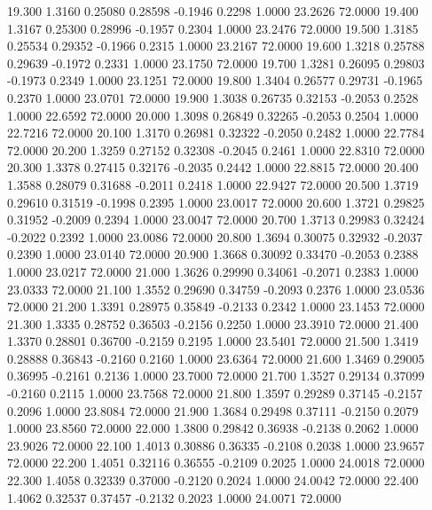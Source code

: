   19.300   1.3160   0.25080   0.28598  -0.1946   0.2298   1.0000  23.2626  72.0000
  19.400   1.3167   0.25300   0.28996  -0.1957   0.2304   1.0000  23.2476  72.0000
  19.500   1.3185   0.25534   0.29352  -0.1966   0.2315   1.0000  23.2167  72.0000
  19.600   1.3218   0.25788   0.29639  -0.1972   0.2331   1.0000  23.1750  72.0000
  19.700   1.3281   0.26095   0.29803  -0.1973   0.2349   1.0000  23.1251  72.0000
  19.800   1.3404   0.26577   0.29731  -0.1965   0.2370   1.0000  23.0701  72.0000
  19.900   1.3038   0.26735   0.32153  -0.2053   0.2528   1.0000  22.6592  72.0000
  20.000   1.3098   0.26849   0.32265  -0.2053   0.2504   1.0000  22.7216  72.0000
  20.100   1.3170   0.26981   0.32322  -0.2050   0.2482   1.0000  22.7784  72.0000
  20.200   1.3259   0.27152   0.32308  -0.2045   0.2461   1.0000  22.8310  72.0000
  20.300   1.3378   0.27415   0.32176  -0.2035   0.2442   1.0000  22.8815  72.0000
  20.400   1.3588   0.28079   0.31688  -0.2011   0.2418   1.0000  22.9427  72.0000
  20.500   1.3719   0.29610   0.31519  -0.1998   0.2395   1.0000  23.0017  72.0000
  20.600   1.3721   0.29825   0.31952  -0.2009   0.2394   1.0000  23.0047  72.0000
  20.700   1.3713   0.29983   0.32424  -0.2022   0.2392   1.0000  23.0086  72.0000
  20.800   1.3694   0.30075   0.32932  -0.2037   0.2390   1.0000  23.0140  72.0000
  20.900   1.3668   0.30092   0.33470  -0.2053   0.2388   1.0000  23.0217  72.0000
  21.000   1.3626   0.29990   0.34061  -0.2071   0.2383   1.0000  23.0333  72.0000
  21.100   1.3552   0.29690   0.34759  -0.2093   0.2376   1.0000  23.0536  72.0000
  21.200   1.3391   0.28975   0.35849  -0.2133   0.2342   1.0000  23.1453  72.0000
  21.300   1.3335   0.28752   0.36503  -0.2156   0.2250   1.0000  23.3910  72.0000
  21.400   1.3370   0.28801   0.36700  -0.2159   0.2195   1.0000  23.5401  72.0000
  21.500   1.3419   0.28888   0.36843  -0.2160   0.2160   1.0000  23.6364  72.0000
  21.600   1.3469   0.29005   0.36995  -0.2161   0.2136   1.0000  23.7000  72.0000
  21.700   1.3527   0.29134   0.37099  -0.2160   0.2115   1.0000  23.7568  72.0000
  21.800   1.3597   0.29289   0.37145  -0.2157   0.2096   1.0000  23.8084  72.0000
  21.900   1.3684   0.29498   0.37111  -0.2150   0.2079   1.0000  23.8560  72.0000
  22.000   1.3800   0.29842   0.36938  -0.2138   0.2062   1.0000  23.9026  72.0000
  22.100   1.4013   0.30886   0.36335  -0.2108   0.2038   1.0000  23.9657  72.0000
  22.200   1.4051   0.32116   0.36555  -0.2109   0.2025   1.0000  24.0018  72.0000
  22.300   1.4058   0.32339   0.37000  -0.2120   0.2024   1.0000  24.0042  72.0000
  22.400   1.4062   0.32537   0.37457  -0.2132   0.2023   1.0000  24.0071  72.0000
